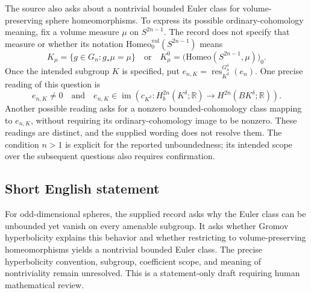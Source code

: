 \documentclass[11pt]{article}
\begin{document}
The source also asks about a nontrivial bounded Euler class for volume-preserving sphere homeomorphisms. To express its possible ordinary-cohomology meaning, fix a volume measure \(\mu\) on \(S^{2n-1}\). The record does not specify that measure or whether its notation \(\mathrm{Homeo}^{\mathrm{vol}}_0(S^{2n-1})\) means
\[
K_\mu=\{g\in G_n:g_*\mu=\mu\}
\quad\text{or}\quad
K_\mu^0=\bigl(\mathrm{Homeo}(S^{2n-1},\mu)\bigr)_0.
\]
Once the intended subgroup \(K\) is specified, put \(e_{n,K}=\operatorname{res}^{G_n^\delta}_{K^\delta}(e_n)\). One precise reading of this question is
\[
e_{n,K}\neq 0
\quad\text{and}\quad
e_{n,K}\in\operatorname{im}\!\left(
 c_{K^\delta}:H_b^{2n}(K^\delta;\mathbb R)
 \longrightarrow H^{2n}(BK^\delta;\mathbb R)
\right).
\]
Another possible reading asks for a nonzero bounded-cohomology class mapping to \(e_{n,K}\), without requiring its ordinary-cohomology image to be nonzero. These readings are distinct, and the supplied wording does not resolve them. The condition \(n>1\) is explicit for the reported unboundedness; its intended scope over the subsequent questions also requires confirmation.
\subsection{Short English statement}
For odd-dimensional spheres, the supplied record asks why the Euler class can be unbounded yet vanish on every amenable subgroup. It asks whether Gromov hyperbolicity explains this behavior and whether restricting to volume-preserving homeomorphisms yields a nontrivial bounded Euler class. The precise hyperbolicity convention, subgroup, coefficient scope, and meaning of nontriviality remain unresolved. This is a statement-only draft requiring human mathematical review.
\end{document}
